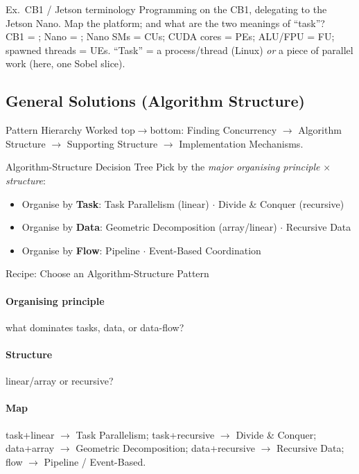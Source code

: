 \multend

\begin{example2}{Ex.\ CB1 / Jetson terminology}
    Programming on the CB1, delegating to the Jetson Nano. Map the platform; and what are the two meanings of ``task''?
     \\ 
    CB1 = ; Nano = ; Nano SMs = CUs; CUDA cores = PEs; ALU/FPU = FU; spawned threads = UEs. ``Task'' = a process/thread (Linux) \emph{or} a piece of parallel work (here, one Sobel slice).
\end{example2}



\subsection{General Solutions (Algorithm Structure)}

\begin{concept}{Pattern Hierarchy}
    Worked top$\to$bottom: Finding Concurrency $\to$ Algorithm Structure $\to$ Supporting Structure $\to$ Implementation Mechanisms.
\end{concept}

\begin{concept}{Algorithm-Structure Decision Tree}
    Pick by the \emph{major organising principle} $\times$ \emph{structure}:
    \begin{itemize}
        \item Organise by \textbf{Task}: Task Parallelism (linear) $\cdot$ Divide \& Conquer (recursive)
        \item Organise by \textbf{Data}: Geometric Decomposition (array/linear) $\cdot$ Recursive Data
        \item Organise by \textbf{Flow}: Pipeline $\cdot$ Event-Based Coordination
    \end{itemize}
\end{concept}


\begin{KR}{Recipe: Choose an Algorithm-Structure Pattern}
    \paragraph{Organising principle} what dominates tasks, data, or data-flow?
    \paragraph{Structure} linear/array or recursive?
    \paragraph{Map} task+linear $\to$ Task Parallelism; task+recursive $\to$ Divide \& Conquer; data+array $\to$ Geometric Decomposition; data+recursive $\to$ Recursive Data; flow $\to$ Pipeline / Event-Based.
\end{KR}

